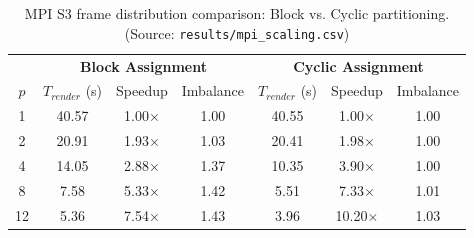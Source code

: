\begin{table}[htbp]
\centering
\small
\caption{MPI S3 frame distribution comparison: Block vs. Cyclic partitioning. (Source: \texttt{results/mpi\_scaling.csv})}
\label{tab:s3_comparison}
\begin{tabular}{c|ccc|ccc}
\toprule
& \multicolumn{3}{c|}{\textbf{Block Assignment}} & \multicolumn{3}{c}{\textbf{Cyclic Assignment}} \\
$p$ & $T_{render}$ (s) & Speedup & Imbalance & $T_{render}$ (s) & Speedup & Imbalance \\
\midrule
1 & 40.57 & 1.00$\times$ & 1.00 & 40.55 & 1.00$\times$ & 1.00 \\
2 & 20.91 & 1.93$\times$ & 1.03 & 20.41 & 1.98$\times$ & 1.00 \\
4 & 14.05 & 2.88$\times$ & 1.37 & 10.35 & 3.90$\times$ & 1.00 \\
8 & 7.58 & 5.33$\times$ & 1.42 & 5.51 & 7.33$\times$ & 1.01 \\
12 & 5.36 & 7.54$\times$ & 1.43 & 3.96 & 10.20$\times$ & 1.03 \\
\bottomrule
\end{tabular}
\end{table}
